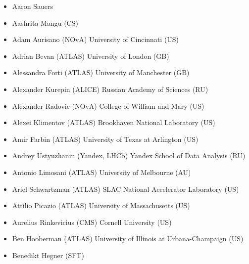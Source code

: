 %

\begin{itemize}
 \item Aaron Sauers %
 \item Aashrita Mangu (CS) %
 \item Adam Aurisano (NOvA)
       \newline University of Cincinnati (US)
 \item Adrian Bevan (ATLAS)
       \newline University of London (GB)
 \item Alessandra Forti (ATLAS)
       \newline University of Manchester (GB)
 \item Alexander Kurepin (ALICE)
       \newline Russian Academy of Sciences (RU)
 \item Alexander Radovic (NOvA)
       \newline College of William and Mary (US)
 \item Alexei Klimentov (ATLAS)
       \newline Brookhaven National Laboratory (US)
 \item Amir Farbin (ATLAS)
       \newline University of Texas at Arlington (US)
 \item Andrey Ustyuzhanin (Yandex, LHCb)
       \newline Yandex School of Data Analysis (RU)
 \item Antonio Limosani (ATLAS)
       \newline University of Melbourne (AU)
 \item Ariel Schwartzman (ATLAS)
       \newline SLAC National Accelerator  Laboratory (US)
 \item Attilio Picazio (ATLAS)
       \newline University of Massachusetts (US)
 \item Aurelius Rinkevicius (CMS)
       \newline Cornell University (US)
 \item Ben Hooberman (ATLAS)
       \newline University of Illinois at Urbana-Champaign (US)
 \item Benedikt Hegner (SFT)

\end{itemize}
